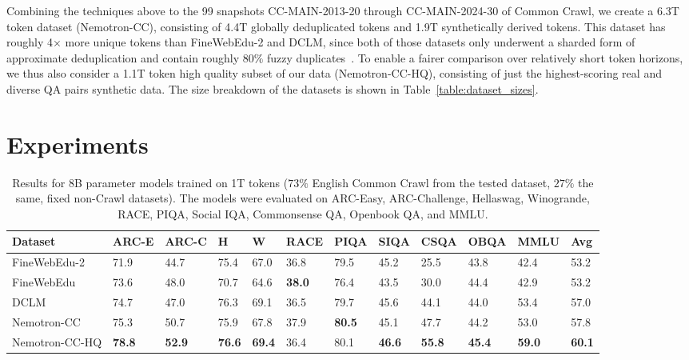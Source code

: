 \documentclass[11pt]{article}
\newcommand{\DCLM}{\textsc{DCLM}\xspace}
\newcommand{\Ours}{Nemotron-CC\xspace}
\begin{document}
Combining the techniques above to the 99 snapshots CC-MAIN-2013-20 through CC-MAIN-2024-30 of Common Crawl, we create a 6.3T token dataset (\Ours), consisting of 4.4T globally deduplicated tokens and 1.9T synthetically derived tokens. This dataset has roughly 4$\times$ more unique tokens than FineWebEdu-2 and \DCLM, since both of those datasets only underwent a sharded form of approximate deduplication and contain roughly $80\%$ fuzzy duplicates~\citep{fineweb-edu-discussion,li2024datacomp}. To enable a fairer comparison over relatively short token horizons, we thus also consider a 1.1T token high quality subset of our data (\Ours-HQ), consisting of just the highest-scoring real and diverse QA pairs synthetic data. The size breakdown of the datasets is shown in Table~\ref{table:dataset_sizes}.

\section{Experiments}

\begin{table}[!hbt]\small\centering
\setlength{\tabcolsep}{5pt}
\begin{tabularx}{\textwidth}{Xlllllllllll}
\toprule
\textbf{Dataset}        & \textbf{ARC-E} & \textbf{ARC-C} & \textbf{H}    & \textbf{W}    & \textbf{RACE} & \textbf{PIQA} & \textbf{SIQA} & \textbf{CSQA} & \textbf{OBQA} & \textbf{MMLU} & \textbf{Avg}       \\ \midrule
FineWebEdu-2          & 71.9          & 44.7          & 75.4          & 67.0          & 36.8          & 79.5          & 45.2          & 25.5           & 43.8          & 42.4          & 53.2          \\
FineWebEdu            & 73.6          & 48.0          & 70.7          & 64.6          & \textbf{38.0} & 76.4          & 43.5          & 30.0           & 44.4          & 42.9          & 53.2          \\
\DCLM                 & 74.7          & 47.0          & 76.3          & 69.1          & 36.5          & 79.7          & 45.6          & 44.1           & 44.0          & 53.4          & 57.0          \\
\Ours                 & 75.3          & 50.7          & 75.9          & 67.8          & 37.9          & \textbf{80.5} & 45.1          & 47.7           & 44.2          & 53.0          & 57.8          \\
\Ours-HQ              & \textbf{78.8} & \textbf{52.9} & \textbf{76.6} & \textbf{69.4} & 36.4          & 80.1          & \textbf{46.6} & \textbf{55.8}  & \textbf{45.4} & \textbf{59.0} & \textbf{60.1} \\ \bottomrule
\end{tabularx}
\caption{Results for 8B parameter models trained on 1T tokens ($73\%$ English Common Crawl from the tested dataset, $27\%$ the same, fixed non-Crawl datasets). The models were evaluated on ARC-Easy, ARC-Challenge, Hellaswag, Winogrande, RACE, PIQA, Social IQA, Commonsense QA, Openbook QA, and MMLU.}
\label{table:main_detailed}
\end{table}
\end{document}
